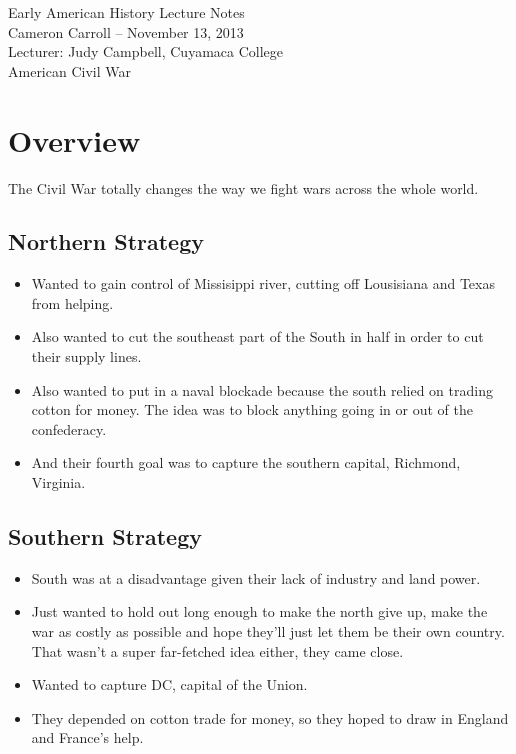 \documentclass{article}
\begin{document}
\begin{center}
  {\small{} Early American History Lecture Notes} \\[0.6cm]
  {\small{} Cameron Carroll -- November 13, 2013} \\[0.6cm]
  {\small{} Lecturer: Judy Campbell, Cuyamaca College}\\[1cm]
  {\small{} American Civil War}\\[1cm]
\end{center}

\tableofcontents
\newpage

\section{Overview}
  The Civil War totally changes the way we fight wars across the whole world.

  \subsection{Northern Strategy}
    \begin{itemize}
      \item Wanted to gain control of Missisippi river, cutting off Lousisiana and Texas from helping.
      \item Also wanted to cut the southeast part of the South in half in order to cut their supply lines.
      \item Also wanted to put in a naval blockade because the south relied on trading cotton for money. The idea was to block anything going in or out of the confederacy.
      \item And their fourth goal was to capture the southern capital, Richmond, Virginia.
    \end{itemize}
  \subsection{Southern Strategy}
    \begin{itemize}
      \item South was at a disadvantage given their lack of industry and land power.
      \item Just wanted to hold out long enough to make the north give up, make the war as costly as possible and hope they'll just let them be their own country. That wasn't a super far-fetched idea either, they came close.
      \item Wanted to capture DC, capital of the Union.
      \item They depended on cotton trade for money, so they hoped to draw in England and France's help.
    \end{itemize}
\end{document}
